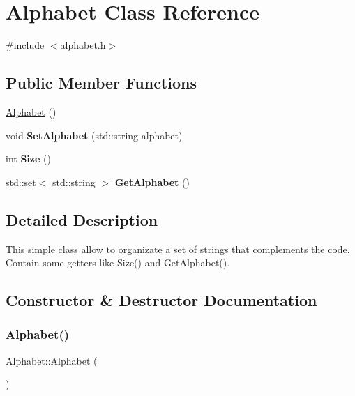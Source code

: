 \hypertarget{classAlphabet}{}\section{Alphabet Class Reference}
\label{classAlphabet}


{\ttfamily \#include $<$alphabet.\+h$>$}

\subsection*{Public Member Functions}
\begin{DoxyCompactItemize}
\item 
\hyperlink{classAlphabet_aac9f2f615174ca6c8f89331239cb765e}{Alphabet} ()
\item 
\mbox{\label{classAlphabet_a2a61d36e511d77704215dce942847ed9}} 
void {\bfseries Set\+Alphabet} (std\+::string alphabet)
\item 
\mbox{\label{classAlphabet_a154f45f063a75a8116e8f9022440287e}} 
int {\bfseries Size} ()
\item 
\mbox{\label{classAlphabet_aa27c86b98daa058dc4f299b13c76ee8b}} 
std\+::set$<$ std\+::string $>$ {\bfseries Get\+Alphabet} ()
\end{DoxyCompactItemize}


\subsection{Detailed Description}
This simple class allow to organizate a set of strings that complements the code. Contain some getters like Size() and Get\+Alphabet(). 

\subsection{Constructor \& Destructor Documentation}
\mbox{\label{classAlphabet_aac9f2f615174ca6c8f89331239cb765e}} 
\subsubsection{\texorpdfstring{Alphabet()}{Alphabet()}}
{\footnotesize\ttfamily Alphabet\+::\+Alphabet (\begin{DoxyParamCaption}{ }\end{DoxyParamCaption})}

